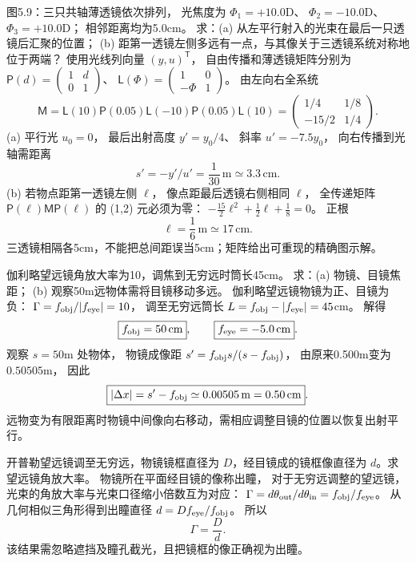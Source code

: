 图5.9：三只共轴薄透镜依次排列，
光焦度为
$\Phi_1=+10.0$D、
$\Phi_2=-10.0$D、
$\Phi_3=+10.0$D；
相邻距离均为5.0cm。
求：(a) 从左平行射入的光束在最后一只透镜后汇聚的位置；
(b) 距第一透镜左侧多远有一点，与其像关于三透镜系统对称地位于两端？
\exsolution
使用光线列向量
$(y,u)^{\mathsf T}$，
自由传播和薄透镜矩阵分别为
$\mathsf P(d)=\begin{pmatrix}1&d\\0&1\end{pmatrix}$、
$\mathsf L(\Phi)=\begin{pmatrix}1&0\\-\Phi&1\end{pmatrix}$。
由左向右全系统
\[
\mathsf M=
\mathsf L(10)\mathsf P(0.05)
\mathsf L(-10)\mathsf P(0.05)\mathsf L(10)
=\begin{pmatrix}1/4&1/8\\-15/2&1/4\end{pmatrix}.
\]
(a) 平行光 $u_0=0$，
最后出射高度 $y'=y_0/4$、
斜率 $u'=-7.5y_0$，
向右传播到光轴需距离
\[
\boxed{s'=-y'/u'=\frac1{30}\,\mathrm m
\simeq3.3\,\mathrm{cm}}.
\]
(b) 若物点距第一透镜左侧 $\ell$，
像点距最后透镜右侧相同 $\ell$，
全传递矩阵
$\mathsf P(\ell)\mathsf M\mathsf P(\ell)$
的 (1,2) 元必须为零：
$-\tfrac{15}{2}\ell^2+\tfrac12\ell+\tfrac18=0$。
正根
\[
\boxed{\ell=\frac16\,\mathrm m\simeq17\,\mathrm{cm}}.
\]
\excheck 三透镜相隔各5cm，不能把总间距误当5cm；矩阵给出可重现的精确图示解。

伽利略望远镜角放大率为10，调焦到无穷远时筒长45cm。
求：(a) 物镜、目镜焦距；
(b) 观察50m远物体需将目镜移动多远。
\exsolution
伽利略望远镜物镜为正、目镜为负：
$\Gamma=f_{\rm obj}/|f_{\rm eye}|=10$，
调至无穷远筒长
$L=f_{\rm obj}-|f_{\rm eye}|=45$cm。
解得
\[
\boxed{f_{\rm obj}=50\,\mathrm{cm}},
\qquad
\boxed{f_{\rm eye}=-5.0\,\mathrm{cm}}.
\]
观察 $s=50$m 处物体，
物镜成像距
$s'=f_{\rm obj}s/(s-f_{\rm obj})$，
由原来0.500m变为
$0.50505$m，
因此
\[
\boxed{|\Delta x|=s'-f_{\rm obj}
\simeq0.00505\,\mathrm m=0.50\,\mathrm{cm}}.
\]
\excheck 远物变为有限距离时物镜中间像向右移动，需相应调整目镜的位置以恢复出射平行。

开普勒望远镜调至无穷远，物镜镜框直径为
$D$，经目镜成的镜框像直径为
$d$。求望远镜角放大率。
\exsolution
物镜所在平面经目镜的像称出瞳，
对于无穷远调整的望远镜，
光束的角放大率与光束口径缩小倍数互为对应：
$\Gamma=d\theta_{\rm out}/d\theta_{\rm in}
=f_{\rm obj}/f_{\rm eye}$。
从几何相似三角形得到出瞳直径
$d=D f_{\rm eye}/f_{\rm obj}$。
所以
\[
\boxed{\Gamma=\frac Dd}.
\]
\excheck 该结果需忽略遮挡及瞳孔截光，且把镜框的像正确视为出瞳。

